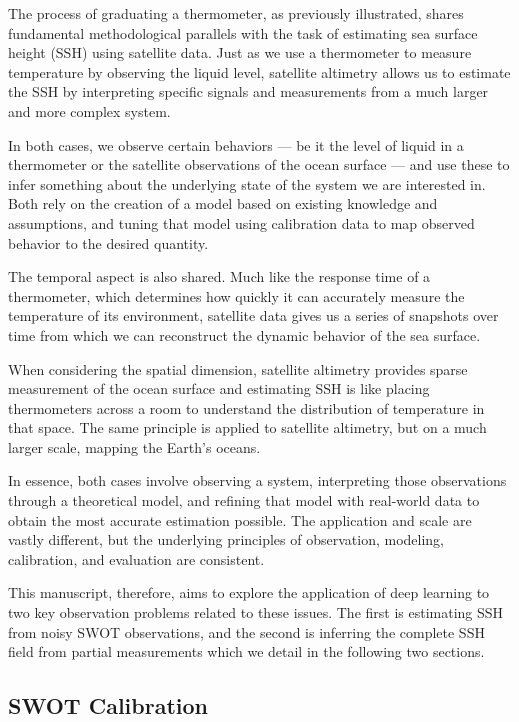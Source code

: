 \begin{bibunit}
The process of graduating a thermometer, as previously illustrated, shares fundamental methodological parallels with the task of estimating sea surface height (SSH) using satellite data.
Just as we use a thermometer to measure temperature by observing the liquid level, satellite altimetry allows us to estimate the SSH by interpreting specific signals and measurements from a much larger and more complex system.

In both cases, we observe certain behaviors — be it the level of liquid in a thermometer or the satellite observations of the ocean surface — and use these to infer something about the underlying state of the system we are interested in. Both rely on the creation of a model based on existing knowledge and assumptions, and tuning that model using calibration data to map observed behavior to the desired quantity.

The temporal aspect is also shared. Much like the response time of a thermometer, which determines how quickly it can accurately measure the temperature of its environment, satellite data gives us a series of snapshots over time from which we can reconstruct the dynamic behavior of the sea surface.

When considering the spatial dimension, satellite altimetry provides sparse measurement of the ocean surface and estimating SSH is like placing thermometers across a room to understand the distribution of temperature in that space. The same principle is applied to satellite altimetry, but on a much larger scale, mapping the Earth's oceans.

In essence, both cases involve observing a system, interpreting those observations through a theoretical model, and refining that model with real-world data to obtain the most accurate estimation possible. The application and scale are vastly different, but the underlying principles of observation, modeling, calibration, and evaluation are consistent.

This manuscript, therefore, aims to explore the application of deep learning to two key observation problems related to these issues. The first is estimating SSH from noisy SWOT observations, and the second is inferring the complete SSH field from partial measurements which we detail in the following two sections.
  
\subsection{SWOT Calibration}


\end{bibunit}
